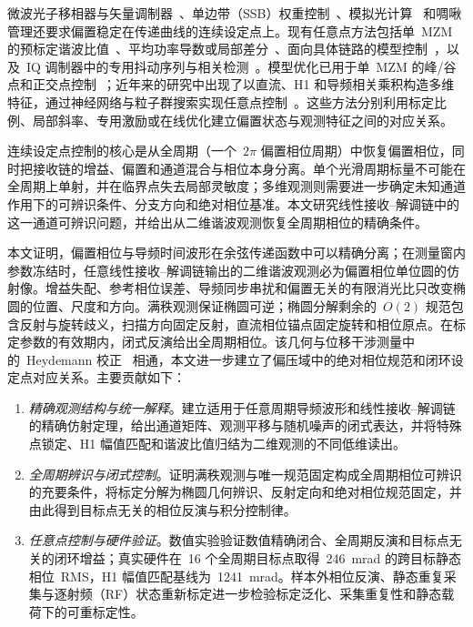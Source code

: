\documentclass[journal]{IEEEtran}
\theoremstyle{plain}
\theoremstyle{remark}
\begin{document}
微波光子移相器与矢量调制器~\cite{yao2009,capmany2007}、单边带（SSB）权重控制~\cite{izutsu1981}、模拟光计算~\cite{shen2017} 和啁啾管理还要求偏置稳定在传递曲线的连续设定点上。现有任意点方法包括单~MZM 的预标定谐波比值~\cite{wang2010}、平均功率导数或局部差分~\cite{tao2014,yuan2019}、面向具体链路的模型控制~\cite{teng2023}，以及~IQ 调制器中的专用抖动序列与相关检测~\cite{li2018,peng2025}。模型优化已用于单~MZM 的峰/谷点和正交点控制~\cite{svarny2022,weller2025}；近年来的研究中出现了以直流、H1 和导频相关乘积构造多维特征，通过神经网络与粒子群搜索实现任意点控制~\cite{hu2026dla2c}。这些方法分别利用标定比例、局部斜率、专用激励或在线优化建立偏置状态与观测特征之间的对应关系。

连续设定点控制的核心是从全周期（一个~$2\pi$ 偏置相位周期）中恢复偏置相位，同时把接收链的增益、偏置和通道混合与相位本身分离。单个光滑周期标量不可能在全周期上单射，并在临界点失去局部灵敏度；多维观测则需要进一步确定未知通道作用下的可辨识条件、分支方向和绝对相位基准。本文研究线性接收--解调链中的这一通道可辨识问题，并给出从二维谐波观测恢复全周期相位的精确条件。

本文证明，偏置相位与导频时间波形在余弦传递函数中可以精确分离；在测量窗内参数冻结时，任意线性接收--解调链输出的二维谐波观测必为偏置相位单位圆的仿射像。增益失配、参考相位误差、导频同步串扰和偏置无关的有限消光比只改变椭圆的位置、尺度和方向。满秩观测保证椭圆可逆；椭圆分解剩余的~$O(2)$ 规范包含反射与旋转歧义，扫描方向固定反射，直流相位锚点固定旋转和相位原点。在标定参数的有效期内，闭式反演给出全周期相位。该几何与位移干涉测量中的~Heydemann 校正~\cite{heydemann1981,fitzgibbon1999} 相通，本文进一步建立了偏压域中的绝对相位规范和闭环设定点对应关系。主要贡献如下：

\begin{enumerate}
\item \emph{精确观测结构与统一解释}。建立适用于任意周期导频波形和线性接收--解调链的精确仿射定理，给出通道矩阵、观测平移与随机噪声的闭式表达，并将特殊点锁定、H1 幅值匹配和谐波比值归结为二维观测的不同低维读出。
\item \emph{全周期辨识与闭式控制}。证明满秩观测与唯一规范固定构成全周期相位可辨识的充要条件，将标定分解为椭圆几何辨识、反射定向和绝对相位规范固定，并由此得到目标点无关的相位反演与积分控制律。
\item \emph{任意点控制与硬件验证}。数值实验验证数值精确闭合、全周期反演和目标点无关的闭环增益；真实硬件在~16 个全周期目标点取得~246~mrad 的跨目标静态相位~RMS，H1 幅值匹配基线为~1241~mrad。样本外相位反演、静态重复采集与逐射频（RF）状态重新标定进一步检验标定泛化、采集重复性和静态载荷下的可重标定性。
\end{enumerate}
\end{document}
